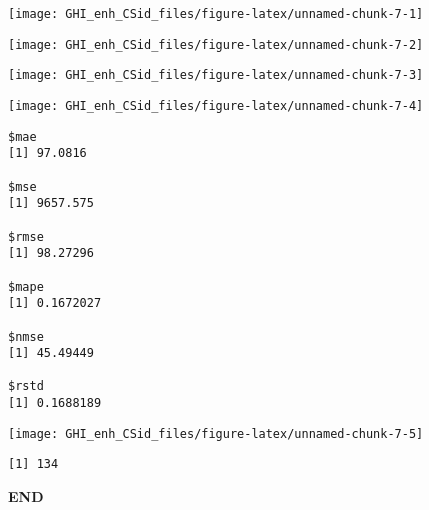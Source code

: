 \documentclass[
  10pt,
  a4paper,oneside]{article}
\begin{document}
\begin{center}\texttt{[image: GHI\_enh\_CSid\_files/figure-latex/unnamed-chunk-7-1]} \end{center}

\begin{center}\texttt{[image: GHI\_enh\_CSid\_files/figure-latex/unnamed-chunk-7-2]} \end{center}

\begin{center}\texttt{[image: GHI\_enh\_CSid\_files/figure-latex/unnamed-chunk-7-3]} \end{center}

\begin{center}\texttt{[image: GHI\_enh\_CSid\_files/figure-latex/unnamed-chunk-7-4]} \end{center}

\begin{verbatim}
$mae
[1] 97.0816

$mse
[1] 9657.575

$rmse
[1] 98.27296

$mape
[1] 0.1672027

$nmse
[1] 45.49449

$rstd
[1] 0.1688189
\end{verbatim}

\begin{center}\texttt{[image: GHI\_enh\_CSid\_files/figure-latex/unnamed-chunk-7-5]} \end{center}

\begin{verbatim}
[1] 134
\end{verbatim}

\textbf{END}
\end{document}
